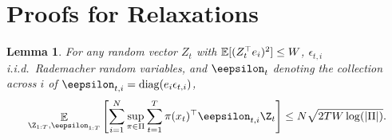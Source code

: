 \documentclass{article}
\newcommand{\exop}{\mathop{\ex}}
\newtheorem{lemma}{Lemma}
\begin{document}
\section{Proofs for Relaxations}
\label{sec:rel.proofs}

\begin{lemma}
  \label{lem:complexity.bound}
  For any random vector $Z_t$ with $\mathbb E[(Z_t^\top e_i)^2] \leq W$, $\epsilon_{t,i}$ i.i.d.\ Rademacher random variables, and $\eepsilon_t$ denoting the collection across $i$ of $\eepsilon_{t,i}=\diag(e_i \epsilon_{t,i})$,
  \begin{equation}
    \exop_{\Z_{1:T},\eepsilon_{1:T}}\left[\sum_{i=1}^N \sup_{\pi\in\Pi} \sum_{t=1}^T \pi(x_t)^\top \eepsilon_{t,i} \Z_t \right] \leq N\sqrt{2 T W \log( \vert \Pi\vert)}.
  \end{equation}
\end{lemma}
\end{document}
